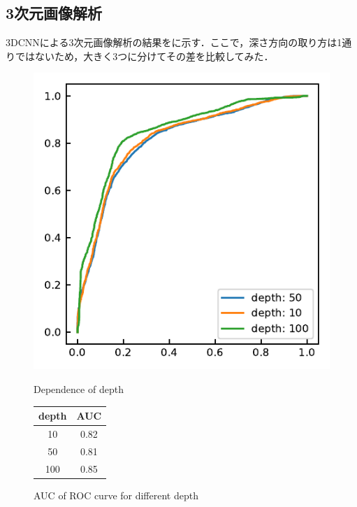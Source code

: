 \subsection{3次元画像解析}
3DCNNによる3次元画像解析の結果をに示す．ここで，深さ方向の取り方は1通りではないため，大きく3つに分けてその差を比較してみた．

\begin{figure}[H]
	\centering
	\begin{minipage}{0.5\columnwidth}
		\centering
		\includegraphics[width=\linewidth]{fig/chapter4/3d/roc/depth_all.pdf}
		\caption{Dependence of depth}
		\label{fig:depthall}
	\end{minipage}
	\makeatletter
	\def\@captype{table}
	\makeatother
	\begin{minipage}{0.4\columnwidth}
		\centering
		\caption{AUC of ROC curve for different depth}
		\label{tab:2DCNNpreprocessing_AUC}
		\begin{tabular}{cc}\toprule
			depth & AUC \\ \midrule
			10 & 0.82 \\ 
			50 & 0.81 \\ 
			100 & 0.85 \\ \bottomrule
		\end{tabular} 
	\end{minipage}
\end{figure}

